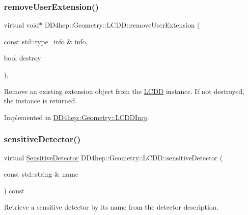 \subsubsection{\texorpdfstring{remove\+User\+Extension()}{removeUserExtension()}}
{\footnotesize\ttfamily virtual void$\ast$ D\+D4hep\+::\+Geometry\+::\+L\+C\+D\+D\+::remove\+User\+Extension (\begin{DoxyParamCaption}\item[{const std\+::type\+\_\+info \&}]{info,  }\item[{bool}]{destroy }\end{DoxyParamCaption})\hspace{0.3cm}{\ttfamily [protected]}, {}}



Remove an existing extension object from the \hyperlink{class_d_d4hep_1_1_geometry_1_1_l_c_d_d}{L\+C\+DD} instance. If not destroyed, the instance is returned. 



Implemented in \hyperlink{class_d_d4hep_1_1_geometry_1_1_l_c_d_d_imp_a9e43af7ad956710acab4aead5a41dc13}{D\+D4hep\+::\+Geometry\+::\+L\+C\+D\+D\+Imp}.

\hypertarget{class_d_d4hep_1_1_geometry_1_1_l_c_d_d_af476b8241b93e82350ec1e5cbf145941}{}\label{class_d_d4hep_1_1_geometry_1_1_l_c_d_d_af476b8241b93e82350ec1e5cbf145941} 
\subsubsection{\texorpdfstring{sensitive\+Detector()}{sensitiveDetector()}}
{\footnotesize\ttfamily virtual \hyperlink{class_d_d4hep_1_1_geometry_1_1_sensitive_detector}{Sensitive\+Detector} D\+D4hep\+::\+Geometry\+::\+L\+C\+D\+D\+::sensitive\+Detector (\begin{DoxyParamCaption}\item[{const std\+::string \&}]{name }\end{DoxyParamCaption}) const\hspace{0.3cm}{\ttfamily [pure virtual]}}



Retrieve a sensitive detector by it\textquotesingle{}s name from the detector description. 




